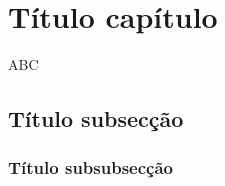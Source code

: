 \section{Título capítulo}
ABC

\subsection{Título subsecção} 

\subsubsection{Título subsubsecção}

